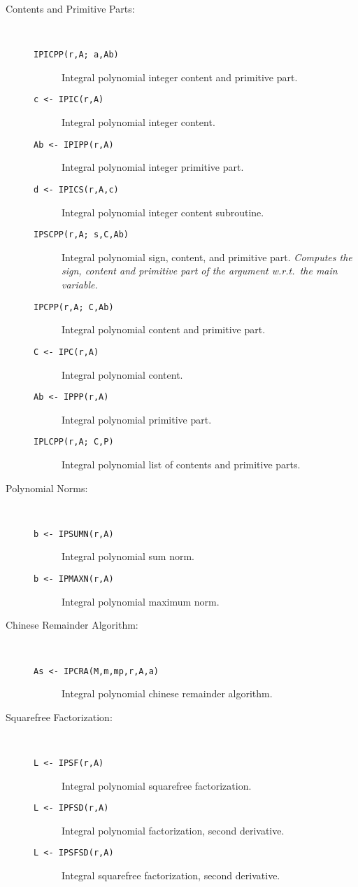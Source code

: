 \begin{description}
\item[Contents and Primitive Parts:] \ \
  \begin{description}
  \item[{\tt  IPICPP(r,A; a,Ab) 
}]  Integral polynomial integer content and primitive part.
  \item[{\tt c <- IPIC(r,A) 
}]  Integral polynomial integer content.
  \item[{\tt Ab <- IPIPP(r,A) 
}]  Integral polynomial integer primitive part.
  \item[{\tt d <- IPICS(r,A,c) 
}]  Integral polynomial integer content subroutine.
  \item[{\tt  IPSCPP(r,A; s,C,Ab) 
}]  Integral polynomial sign, content, and primitive part.
    {\em Computes the sign, content and primitive part of the argument
    w.r.t.\ the main variable.}
  \item[{\tt  IPCPP(r,A; C,Ab) 
}]  Integral polynomial content and primitive part.
  \item[{\tt C <- IPC(r,A) 
}]  Integral polynomial content.
  \item[{\tt Ab <- IPPP(r,A) 
}]  Integral polynomial primitive part.
  \item[{\tt  IPLCPP(r,A; C,P) 
}]  Integral polynomial list of contents and primitive parts.

  \end{description}

\item[Polynomial Norms:] \ \
  \begin{description}
  \item[{\tt b <- IPSUMN(r,A) 
}]  Integral polynomial sum norm.
  \item[{\tt b <- IPMAXN(r,A) 
}]\index{IPMAXN}  Integral polynomial maximum norm.

  \end{description}

\item[Chinese Remainder Algorithm:] \ \
  \begin{description}
  \item[{\tt As <- IPCRA(M,m,mp,r,A,a) 
}]\index{IPCRA}  Integral polynomial chinese remainder algorithm.

  \end{description}

\item[Squarefree Factorization:] \ \
  \begin{description}
  \item[{\tt L <- IPSF(r,A) 
}]  Integral polynomial squarefree factorization.
  \item[{\tt L <- IPFSD(r,A) 
}]\index{IPFSD}  Integral polynomial factorization, second derivative.
  \item[{\tt L <- IPSFSD(r,A) 
}]\index{IPSFSD}  Integral squarefree factorization, second derivative.


\end{description}
\end{description}
